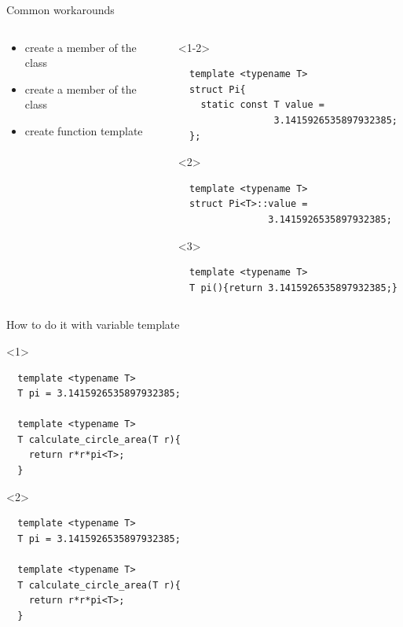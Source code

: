 \documentclass[10pt]{beamer}
\begin{document}
\begin{frame}[fragile]{Common workarounds}
	\begin{columns}
		\begin{column}{0.35\linewidth}
			\begin{itemize}
				\item<1-2> \alert{create a member of the class}
				\item<3-> create a member of the class
				\item<3-> \alert{create function template}
			\end{itemize}
		\end{column} 
		\vrule
		\begin{column}{0.6\linewidth}
		\begin{onlyenv}
				\begin{verbatim}
  template <typename T>
  struct Pi{
    static const T value = 
                 3.1415926535897932385;
  };
			\end{verbatim}
			\end{onlyenv}

			\begin{onlyenv}<2>
				\begin{verbatim}
  template <typename T>
  struct Pi<T>::value =
                3.1415926535897932385; 
				\end{verbatim}
			\end{onlyenv}

			\begin{onlyenv}<3>
				\begin{verbatim}
  template <typename T>
  T pi(){return 3.1415926535897932385;} 
				\end{verbatim}
			\end{onlyenv}
		\end{column}
	\end{columns}
\end{frame}

\begin{frame}[fragile]{How to do it with variable template}

	\begin{onlyenv}
	\begin{verbatim}
  template <typename T>
  T pi = 3.1415926535897932385;

  template <typename T>
  T calculate_circle_area(T r){
    return r*r*pi<T>;
  }
	\end{verbatim}
	\end{onlyenv}

	\begin{onlyenv}
	\begin{verbatim}
  template <typename T>
  T pi = 3.1415926535897932385;

  template <typename T>
  T calculate_circle_area(T r){
    return r*r*pi<T>;
  }
	\end{verbatim}
	\end{onlyenv}
\end{frame}
\end{document}

